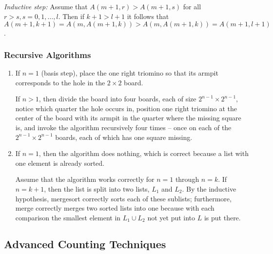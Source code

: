 \documentclass{../../cls/sig-alternate-05-2015}
\begin{document}
\begin{enumerate}
\textit{Inductive step:} Assume that $A(m + 1, r) > A(m + 1, s)$ for all $r > s, s = 0, 1, \ldots, l$.
Then if $k + 1 > l + 1$ it follows that $A(m + 1, k + 1) = A(m, A(m + 1, k)) > A(m, A(m + 1, k)) =
A(m + 1, l + 1)$.

\end{enumerate}

\subsubsection{Recursive Algorithms}
\begin{enumerate}
\item If $n = 1$ (basis step),
place the one right triomino so that its armpit corresponds to the hole in the $2 \times 2$ board.

If $n > 1$,
then divide the board into four boards, each of size $2^{n - 1} \times 2^{n - 1}$,
notice which quarter the hole occurs in,
position one right triomino at the center of the board with its armpit in the quarter where the missing square is,
and invoke the algorithm recursively four times -- once on each of the $2^{n - 1} \times 2^{n - 1}$ boards,
each of which has one square missing.

\item If $n = 1$,
then the algorithm does nothing,
which is correct because a list with one element is already sorted.

Assume that the algorithm works correctly for $n = 1$ through $n = k$.
If $n = k + 1$, then the list is split into two lists,
$L_1$ and $L_2$.
By the inductive hypothesis,
mergesort correctly sorts each of these sublists;
furthermore,
merge correctly merges two sorted lists into one because with each comparison the smallest element in $L_1 \cup L_2$ not yet put into $L$ is put there.

\end{enumerate}

\subsection{Advanced Counting Techniques}
\end{document}
